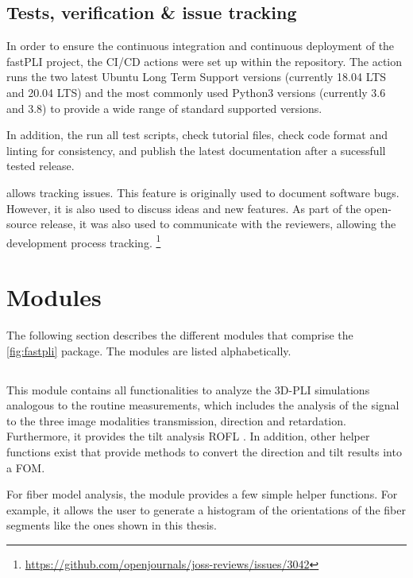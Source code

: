 \subsection{Tests, verification \& issue tracking}
%
In order to ensure the continuous integration and continuous deployment of the \ac{fastPLI} project, the CI/CD actions were set up within the  repository.
The action runs the two latest Ubuntu Long Term Support versions (currently 18.04 LTS and 20.04 LTS) and the most commonly used Python3 versions (currently 3.6 and 3.8) to provide a wide range of standard supported versions.
\par
% 
In addition, the  run all test scripts, check tutorial files, check code format and linting for consistency, and publish the latest documentation after a sucessfull tested release.
\par
%
 allows tracking issues.
This feature is originally used to document software bugs.
However, it is also used to discuss ideas and new features.
As part of the open-source release, it was also used to communicate with the reviewers, allowing the development process tracking.
\footnote{\url{https://github.com/openjournals/joss-reviews/issues/3042}}
%
% 
% 
\section{Modules}
%
The following section describes the different modules that comprise the \cref{fig:fastpli} \python{} package.
The modules are listed alphabetically.
%
%
%
\subsection{}
%
This module contains all functionalities to analyze the \ac{3D-PLI} simulations analogous to the routine measurements, which includes the analysis of the signal to the three image modalities transmission, direction and retardation.
Furthermore, it provides the tilt analysis \ac{ROFL} \cite{Schmitz2018}.
In addition, other helper functions exist that provide methods to convert the direction and tilt results into a \ac{FOM}.
\par
% 
For fiber model analysis, the module provides a few simple helper functions.
For example, it allows the user to generate a histogram of the orientations of the fiber segments like the ones shown in this thesis.
%
% 
% 
